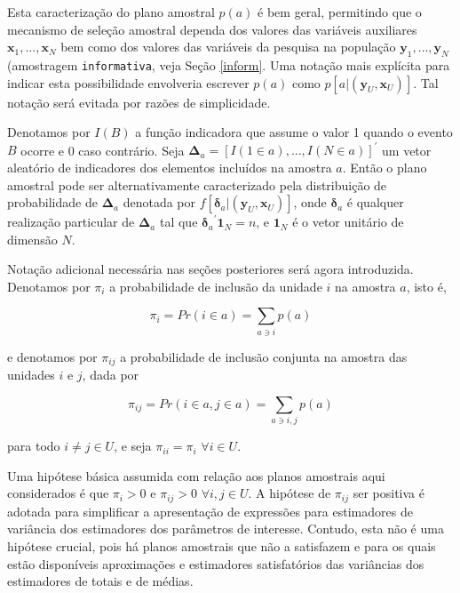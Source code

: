 \documentclass[]{book}
\theoremstyle{definition}
\theoremstyle{definition}
\theoremstyle{definition}
\theoremstyle{remark}
\begin{document}
Esta caracterização do plano amostral \(p(a)\) é bem geral, permitindo
que o mecanismo de seleção amostral dependa dos valores das variáveis
auxiliares \(\mathbf{x}_1 ,\ldots, \mathbf{x}_N\) bem como dos valores
das variáveis da pesquisa na população
\(\mathbf{y}_1 ,\ldots, \mathbf{y}_N\) (amostragem \texttt{informativa},
veja Seção \ref{inform}. Uma notação mais explícita para indicar esta
possibilidade envolveria escrever \(p(a)\) como
\(p\left[ a | (\mathbf{y}_U , \mathbf{x}_U ) \right]\). Tal notação será
evitada por razões de simplicidade.

Denotamos por \(I(B)\) a função indicadora que assume o valor 1 quando o
evento \(B\) ocorre e 0 caso contrário. Seja
\(\mathbf{\Delta}_a = \left[ I(1 \in a) ,\ldots, I(N \in a)\right]^{\prime}\)
um vetor aleatório de indicadores dos elementos incluídos na amostra
\(a\). Então o plano amostral pode ser alternativamente caracterizado
pela distribuição de probabilidade de \(\mathbf{\Delta }_a\) denotada
por
\(f\left[ \mathbf{\delta }_a | \left(\mathbf{y}_U , \mathbf{x}_U \right) \right]\),
onde \(\mathbf{\delta }_a\) é qualquer realização particular de
\(\mathbf{\Delta }_a\) tal que
\({\mathbf{\delta}_a}^{\prime} \mathbf{1}_N = n\), e \(\mathbf{1}_N\) é
o vetor unitário de dimensão \(N\).

Notação adicional necessária nas seções posteriores será agora
introduzida. Denotamos por \(\pi_i\) a probabilidade de inclusão da
unidade \(i\) na amostra \(a\), isto é,

\begin{equation}
\pi_i = Pr\left( i \in a \right) = \sum_{a \ni i} p(a)  \label{eq:ref5}
\end{equation}

e denotamos por \(\pi_{ij}\) a probabilidade de inclusão conjunta na
amostra das unidades \(i\) e \(j\), dada por

\begin{equation}
\pi_{ij} = Pr \left( i \in a , j \in a \right) = \sum_{a \ni i,j} p(a) \label{eq:ref6}
\end{equation}

para todo \(i \neq j \in U\), e seja \(\pi_{ii} = \pi_{i}\)
\(\forall i \in U.\)

Uma hipótese básica assumida com relação aos planos amostrais aqui
considerados é que \(\pi_i > 0\) e \(\pi_{ij} > 0\)
\(\forall i,j \in U.\) A hipótese de \(\pi_{ij}\) ser positiva é adotada
para simplificar a apresentação de expressões para estimadores de
variância dos estimadores dos parâmetros de interesse. Contudo, esta não
é uma hipótese crucial, pois há planos amostrais que não a satisfazem e
para os quais estão disponíveis aproximações e estimadores satisfatórios
das variâncias dos estimadores de totais e de médias.
\end{document}
